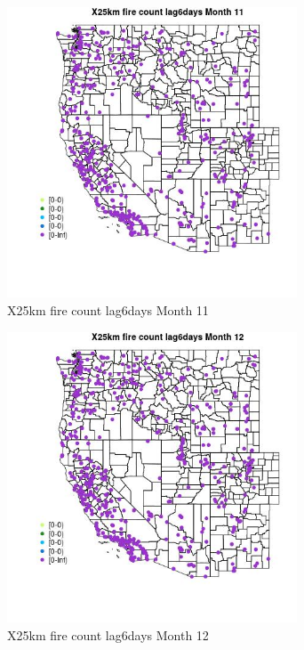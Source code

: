 \begin{figure} 
\centering  
\includegraphics[width=0.77\textwidth]{Code_Outputs/Report_ML_input_PM25_Step4_part_e_de_duplicated_aves_compiled_2019-05-14wNAs_MapObsMo11X25km_fire_count_lag6days.jpg} 
\caption{\label{fig:Report_ML_input_PM25_Step4_part_e_de_duplicated_aves_compiled_2019-05-14wNAsMapObsMo11X25km_fire_count_lag6days}X25km fire count lag6days Month 11} 
\end{figure} 
 

\begin{figure} 
\centering  
\includegraphics[width=0.77\textwidth]{Code_Outputs/Report_ML_input_PM25_Step4_part_e_de_duplicated_aves_compiled_2019-05-14wNAs_MapObsMo12X25km_fire_count_lag6days.jpg} 
\caption{\label{fig:Report_ML_input_PM25_Step4_part_e_de_duplicated_aves_compiled_2019-05-14wNAsMapObsMo12X25km_fire_count_lag6days}X25km fire count lag6days Month 12} 
\end{figure} 
 

